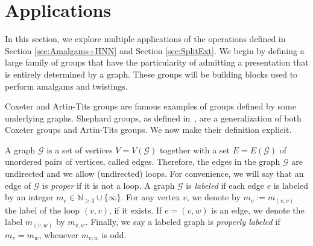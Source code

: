 \documentclass[11pt,letterpaper]{amsart}
\newcommand{\GG}{\mathcal{G}}
\begin{document}
\section{Applications} \label{sec:applications}

In this section, we explore multiple applications of the operations defined in Section \ref{sec:Amalgams+HNN} and Section \ref{sec:SplitExt}. We begin by defining a large family of groups that have the particularity of admitting a presentation that is entirely determined by a graph. These groups will be building blocks used to perform amalgams and twistings.

Coxeter and Artin-Tits groups are famous examples of groups defined by some underlying graphs. Shephard groups, as defined in~\cite{Kapovich1998,Goldman2024}, are a generalization of both Coxeter groups and Artin-Tits groups. We now make their definition explicit.

A graph $\GG$ is a set of vertices $V = V(\GG)$ together with a set $E = E(\GG)$ of unordered pairs of vertices, called edges. Therefore, the edges in the graph $\GG$ are undirected and we allow (undirected) loops. For convenience, we will say that an edge of $\GG$ is \emph{proper} if it is not a loop. A graph $\GG$ is \emph{labeled} if each edge $e$ is labeled by an integer $m_e \in \mathbb{N}_{\geq 3} \cup \{ \infty \}$. For any vertex $v$, we denote by $m_v:=m_{(v,v)}$ the label of the loop $(v,v)$, if it exists. If $e = (v,w)$ is an edge, we denote the label $m_{(v,w)}$ by $m_{v,w}$. Finally, we say a labeled graph is \emph{properly labeled} if $m_v = m_w$, whenever $m_{v,w}$ is odd.
\end{document}
